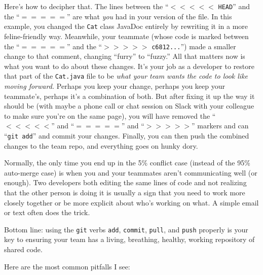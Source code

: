 \begin{itemize}
Here's how to decipher that. The lines between the ``$<<<<<$ \texttt{HEAD}''
and the ``$=====$'' are what \textit{you} had in your version of the file. In
this example, you changed the \texttt{Cat} class JavaDoc entirely by rewriting
it in a more feline-friendly way. Meanwhile, your teammate (whose code is
marked between the ``$=====$'' and the ``$>>>>>$ \texttt{c6812...}'') made a
smaller change to that comment, changing ``furry'' to ``fuzzy.'' All that
matters now is what you want to do about these changes. It's your job as a
developer to restore that part of the \texttt{Cat.java} file to be \textit{what
your team wants the code to look like moving forward.} Perhaps you keep your
change, perhaps you keep your teammate's, perhaps it's a combination of both.
But after fixing it up the way it should be (with maybe a phone call or chat
session on Slack with your colleague to make sure you're on the same page), you
will have removed the ``$<<<<<$'' and ``$=====$'' and ``$>>>>>$'' markers and
can ``\texttt{git add}'' and commit your changes. Finally, you can then push
the combined changes to the team repo, and everything goes on hunky dory.

Normally, the only time you end up in the 5\% conflict case (instead of the
95\% auto-merge case) is when you and your teammates aren't communicating well
(or enough). Two developers both editing the same lines of code and not
realizing that the other person is doing it is usually a sign that you need to
work more closely together or be more explicit about who's working on what. A
simple email or text often does the trick.

\end{itemize}

Bottom line: using the \texttt{git} verbs \texttt{add}, \texttt{commit},
\texttt{pull}, and \texttt{push} properly is your key to ensuring your team
has a living, breathing, healthy, working repository of shared code.

Here are the most common pitfalls I see:

